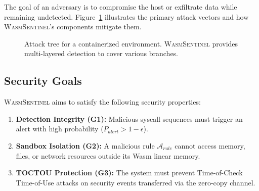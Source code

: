 The goal of an adversary is to compromise the host or exfiltrate data while remaining undetected. Figure~\ref{fig:attack-tree} illustrates the primary attack vectors and how \textsc{WasmSentinel}'s components mitigate them.

\begin{figure}[h]
\centering
{}
\caption{Attack tree for a containerized environment. \textsc{WasmSentinel} provides multi-layered detection to cover various branches.}
\label{fig:attack-tree}
\end{figure}

\subsection{Security Goals}
\label{sec:threat-goals}

\textsc{WasmSentinel} aims to satisfy the following security properties:

\begin{enumerate}
    \item \textbf{Detection Integrity (G1):} Malicious syscall sequences must trigger an alert with high probability ($P_{alert} > 1 - \epsilon$).
    \item \textbf{Sandbox Isolation (G2):} A malicious rule $\mathcal{A}_{rule}$ cannot access memory, files, or network resources outside its Wasm linear memory.
    \item \textbf{TOCTOU Protection (G3):} The system must prevent Time-of-Check Time-of-Use attacks on security events transferred via the zero-copy channel.
\end{enumerate}
